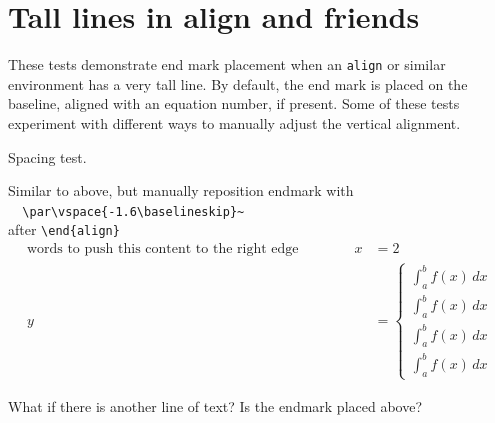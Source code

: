 \clearpage
\section{Tall lines in align and friends}

These tests demonstrate end mark placement when an \texttt{align} or similar environment has a very tall line.
By default, the end mark is placed on the baseline, aligned with an equation number, if present.
Some of these tests experiment with different ways to manually adjust the vertical alignment.

Spacing test.
\begin{test}
  Similar to above, but manually reposition endmark with\\
  \verb|  \par\vspace{-1.6\baselineskip}~|\\
  after \verb|\end{align}|
  \begin{align}
    \text{words to push this content to the right edge}\qquad\qquad x & = 2\\
    y & =
        \begin{cases}
          \int_a^b f(x)\,dx \\
          \int_a^b f(x)\,dx \\
          \int_a^b f(x)\,dx \\
          \int_a^b f(x)\,dx
        \end{cases}
  \end{align}\qedprev[1.6]\hspace{0.001pt}\par\vspace{.6\baselineskip}
  What if there is another line of text?  Is the endmark placed above?
\end{test}

